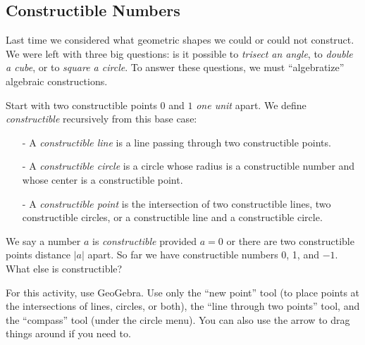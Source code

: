 \documentclass[12pt]{article}
\theoremstyle{plain}
\theoremstyle{definition}
\theoremstyle{remark}
\newcommand{\todayis}[1]{\clearpage{\rhead{\footnotesize #1}}}
\begin{document}
\todayis{Friday, January 18}

\subsection*{Constructible Numbers}

Last time we considered what geometric shapes we could or could not construct.  We were left with three big questions: is it possible to \emph{trisect an angle}, to \emph{double a cube}, or to \emph{square a circle}.  To answer these questions, we must ``algebratize'' algebraic constructions.

Start with two constructible points $0$ and $1$ {\em one unit} apart.  We define {\em constructible} recursively from this base case:

\begin{itemize}
\setlength\itemsep{0em}
  \setlength\parskip{0pt}
  \setlength\parsep{0pt}
\item[-] A {\em constructible line} is a line passing through two constructible points.
\item[-] A {\em constructible circle} is a circle whose radius is a constructible number and whose center is a constructible point.
\item[-] A {\em constructible point} is the intersection of two constructible lines, two constructible circles, or a constructible line and a constructible circle.
\end{itemize}

We say a number $a$ is \emph{constructible} provided $a = 0$ or there are two constructible points distance $|a|$ apart.  So far we have constructible numbers 0, 1, and $-1$.  What else is constructible?

For this activity, use GeoGebra.  Use only the ``new point'' tool (to place points at the intersections of lines, circles, or both), the ``line through two points'' tool, and the ``compass'' tool (under the circle menu).  You can also use the arrow to drag things around if you need to.
\end{document}
